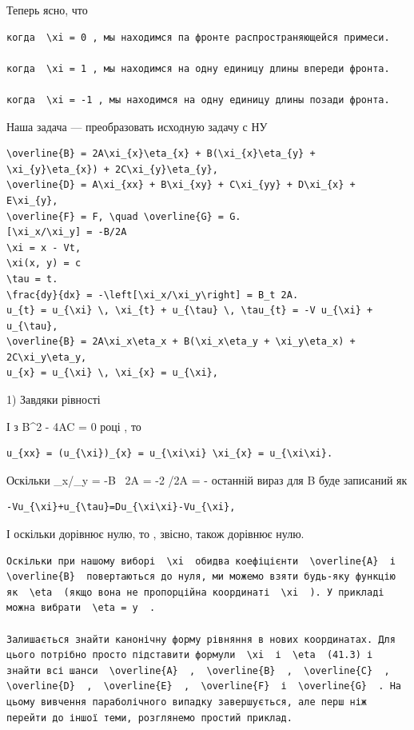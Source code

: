 \documentclass[
  ukrainian,
]{article}
\begin{document}
Теперь ясно, что

\begin{verbatim}
когда  \xi = 0 , мы находимся па фронте распространяющейся примеси.

когда  \xi = 1 , мы находимся на одну единицу длины впереди фронта.

когда  \xi = -1 , мы находимся на одну единицу длины позади фронта.
\end{verbatim}

Наша задача --- преобразовать исходную задачу с НУ

\begin{verbatim}
\overline{B} = 2A\xi_{x}\eta_{x} + B(\xi_{x}\eta_{y} + \xi_{y}\eta_{x}) + 2C\xi_{y}\eta_{y},
\overline{D} = A\xi_{xx} + B\xi_{xy} + C\xi_{yy} + D\xi_{x} + E\xi_{y},
\overline{F} = F, \quad \overline{G} = G.
[\xi_x/\xi_y] = -B/2A
\xi = x - Vt,
\xi(x, y) = c
\tau = t.
\frac{dy}{dx} = -\left[\xi_x/\xi_y\right] = B_t 2A.
u_{t} = u_{\xi} \, \xi_{t} + u_{\tau} \, \tau_{t} = -V u_{\xi} + u_{\tau},
\overline{B} = 2A\xi_x\eta_x + B(\xi_x\eta_y + \xi_y\eta_x) + 2C\xi_y\eta_y,
u_{x} = u_{\xi} \, \xi_{x} = u_{\xi},
\end{verbatim}

1) Завдяки рівності

І з B\^{}2 - 4AC = 0 році , то

\begin{verbatim}
u_{xx} = (u_{\xi})_{x} = u_{\xi\xi} \xi_{x} = u_{\xi\xi}.
\end{verbatim}

Оскільки \xi\_x/\xi\_y = -B ~2A = -2 /2A = -
останній вираз для B буде записаний як

\begin{verbatim}
-Vu_{\xi}+u_{\tau}=Du_{\xi\xi}-Vu_{\xi},
\end{verbatim}

І оскільки  дорівнює нулю, то  , звісно, також
дорівнює нулю.

\begin{verbatim}
Оскільки при нашому виборі  \xi  обидва коефіцієнти  \overline{A}  і  \overline{B}  повертаються до нуля, ми можемо взяти будь-яку функцію як  \eta  (якщо вона не пропорційна координаті  \xi  ). У прикладі можна вибрати  \eta = y  .

Залишається знайти канонічну форму рівняння в нових координатах. Для цього потрібно просто підставити формули  \xi  і  \eta  (41.3) і знайти всі шанси  \overline{A}  ,  \overline{B}  ,  \overline{C}  ,  \overline{D}  ,  \overline{E}  ,  \overline{F}  і  \overline{G}  . На цьому вивчення параболічного випадку завершується, але перш ніж перейти до іншої теми, розглянемо простий приклад.
\end{verbatim}
\end{document}

